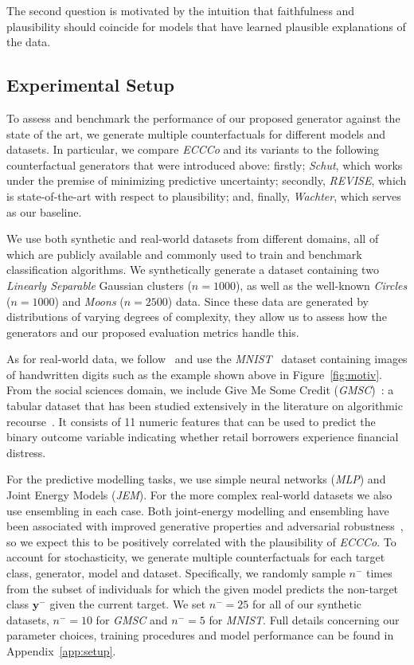 The second question is motivated by the intuition that faithfulness and plausibility should coincide for models that have learned plausible explanations of the data.

\subsection{Experimental Setup}

To assess and benchmark the performance of our proposed generator against the state of the art, we generate multiple counterfactuals for different models and datasets. In particular, we compare \textit{ECCCo} and its variants to the following counterfactual generators that were introduced above: firstly; \textit{Schut}, which works under the premise of minimizing predictive uncertainty; secondly, \textit{REVISE}, which is state-of-the-art with respect to plausibility; and, finally, \textit{Wachter}, which serves as our baseline. 

We use both synthetic and real-world datasets from different domains, all of which are publicly available and commonly used to train and benchmark classification algorithms. We synthetically generate a dataset containing two \textit{Linearly Separable} Gaussian clusters ($n=1000$), as well as the well-known \textit{Circles} ($n=1000$) and \textit{Moons} ($n=2500$) data. Since these data are generated by distributions of varying degrees of complexity, they allow us to assess how the generators and our proposed evaluation metrics handle this.

As for real-world data, we follow~\citet{schut2021generating} and use the \textit{MNIST}~\citep{lecun1998mnist} dataset containing images of handwritten digits such as the example shown above in Figure~\ref{fig:motiv}. From the social sciences domain, we include Give Me Some Credit (\textit{GMSC})~\citep{kaggle2011give}: a tabular dataset that has been studied extensively in the literature on algorithmic recourse~\citep{pawelczyk2021carla}. It consists of 11 numeric features that can be used to predict the binary outcome variable indicating whether retail borrowers experience financial distress. 

For the predictive modelling tasks, we use simple neural networks (\textit{MLP}) and Joint Energy Models (\textit{JEM}). For the more complex real-world datasets we also use ensembling in each case. Both joint-energy modelling and ensembling have been associated with improved generative properties and adversarial robustness~\citep{grathwohl2020your,lakshminarayanan2016simple}, so we expect this to be positively correlated with the plausibility of \textit{ECCCo}. To account for stochasticity, we generate multiple counterfactuals for each target class, generator, model and dataset. Specifically, we randomly sample $n^{-}$ times from the subset of individuals for which the given model predicts the non-target class $\mathbf{y}^{-}$ given the current target. We set $n^{-}=25$ for all of our synthetic datasets, $n^{-}=10$ for \textit{GMSC} and $n^{-}=5$ for \textit{MNIST}. Full details concerning our parameter choices, training procedures and model performance can be found in Appendix~\ref{app:setup}.

